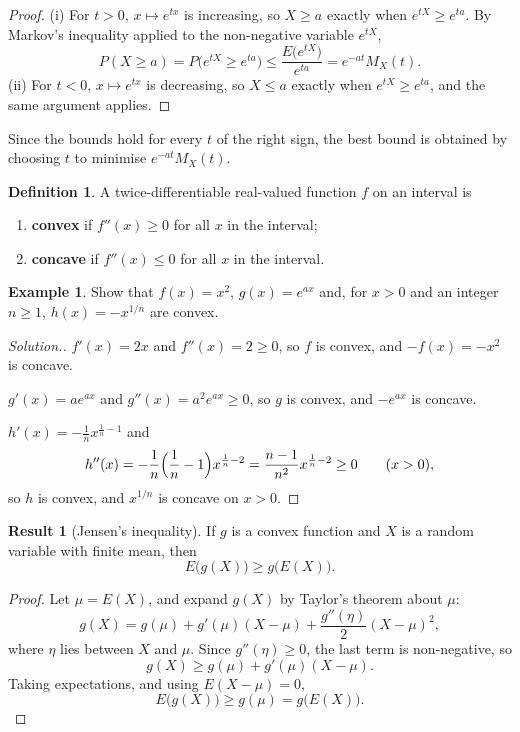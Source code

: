 \documentclass[11pt,a4paper]{article}
\theoremstyle{definition}
\newtheorem{defn}[thm]{Definition}
\newtheorem{exa}[thm]{Example}
\newtheorem{result}[thm]{Result}
\newenvironment{solution}
  {\renewcommand{\qedsymbol}{}\begin{proof}[\textit{Solution}.]}
  {\end{proof}}
\begin{document}
\begin{proof}
(i) For $t > 0$, $x \mapsto e^{tx}$ is increasing, so $X \ge a$ exactly when $e^{tX} \ge e^{ta}$. By Markov's inequality applied to the non-negative variable $e^{tX}$,
\[
P(X \ge a) = P\bigl(e^{tX} \ge e^{ta}\bigr) \le \frac{E\bigl(e^{tX}\bigr)}{e^{ta}} = e^{-at}M_X(t) .
\]
(ii) For $t < 0$, $x \mapsto e^{tx}$ is decreasing, so $X \le a$ exactly when $e^{tX} \ge e^{ta}$, and the same argument applies.
\end{proof}

Since the bounds hold for every $t$ of the right sign, the best bound is obtained by choosing $t$ to minimise $e^{-at}M_X(t)$.

\begin{defn}
A twice-differentiable real-valued function $f$ on an interval is
\begin{enumerate}[label=(\roman*)]
\item \textbf{convex} if $f''(x) \ge 0$ for all $x$ in the interval;
\item \textbf{concave} if $f''(x) \le 0$ for all $x$ in the interval.
\end{enumerate}
\end{defn}

\begin{exa}\label{exa:convex}
Show that $f(x) = x^2$, $g(x) = e^{ax}$ and, for $x > 0$ and an integer $n \ge 1$, $h(x) = -x^{1/n}$ are convex.
\end{exa}

\begin{solution}
$f'(x) = 2x$ and $f''(x) = 2 \ge 0$, so $f$ is convex, and $-f(x) = -x^2$ is concave.

$g'(x) = ae^{ax}$ and $g''(x) = a^2e^{ax} \ge 0$, so $g$ is convex, and $-e^{ax}$ is concave.

$h'(x) = -\frac1nx^{\frac1n - 1}$ and
\[
h''(x) = -\frac1n\Bigl(\frac1n - 1\Bigr)x^{\frac1n - 2} = \frac{n - 1}{n^2}x^{\frac1n - 2} \ge 0 \qquad (x > 0) ,
\]
so $h$ is convex, and $x^{1/n}$ is concave on $x > 0$.
\end{solution}

\begin{result}[Jensen's inequality]\label{res:jensen}
If $g$ is a convex function and $X$ is a random variable with finite mean, then
\[
E\bigl(g(X)\bigr) \ge g\bigl(E(X)\bigr) .
\]
\end{result}

\begin{proof}
Let $\mu = E(X)$, and expand $g(X)$ by Taylor's theorem about $\mu$:
\[
g(X) = g(\mu) + g'(\mu)(X - \mu) + \frac{g''(\eta)}{2}(X - \mu)^2 ,
\]
where $\eta$ lies between $X$ and $\mu$. Since $g''(\eta) \ge 0$, the last term is non-negative, so
\[
g(X) \ge g(\mu) + g'(\mu)(X - \mu) .
\]
Taking expectations, and using $E(X - \mu) = 0$,
\[
E\bigl(g(X)\bigr) \ge g(\mu) = g\bigl(E(X)\bigr) .
\]
\end{proof}
\end{document}
